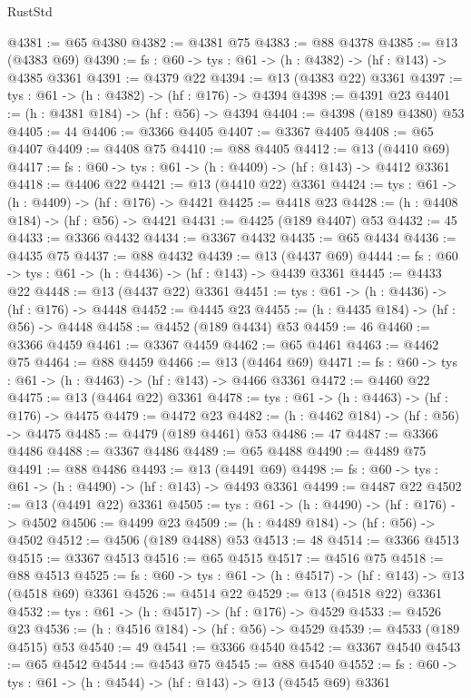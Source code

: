 \begin{lexlean}{RustStd}
\begin{coremodule}
@4381 := @65 @4380
@4382 := @4381 @75
@4383 := @88 @4378
@4385 := @13 (@4383 @69)
@4390 := {fs : @60} -> {tys : @61} -> (h : @4382) -> (hf : @143) -> @4385 @3361
@4391 := @4379 @22
@4394 := @13 (@4383 @22) @3361
@4397 := {tys : @61} -> (h : @4382) -> (hf : @176) -> @4394
@4398 := @4391 @23
@4401 := (h : @4381 @184) -> (hf : @56) -> @4394
@4404 := @4398 (@189 @4380) @53
@4405 := 44
@4406 := @3366 @4405
@4407 := @3367 @4405
@4408 := @65 @4407
@4409 := @4408 @75
@4410 := @88 @4405
@4412 := @13 (@4410 @69)
@4417 := {fs : @60} -> {tys : @61} -> (h : @4409) -> (hf : @143) -> @4412 @3361
@4418 := @4406 @22
@4421 := @13 (@4410 @22) @3361
@4424 := {tys : @61} -> (h : @4409) -> (hf : @176) -> @4421
@4425 := @4418 @23
@4428 := (h : @4408 @184) -> (hf : @56) -> @4421
@4431 := @4425 (@189 @4407) @53
@4432 := 45
@4433 := @3366 @4432
@4434 := @3367 @4432
@4435 := @65 @4434
@4436 := @4435 @75
@4437 := @88 @4432
@4439 := @13 (@4437 @69)
@4444 := {fs : @60} -> {tys : @61} -> (h : @4436) -> (hf : @143) -> @4439 @3361
@4445 := @4433 @22
@4448 := @13 (@4437 @22) @3361
@4451 := {tys : @61} -> (h : @4436) -> (hf : @176) -> @4448
@4452 := @4445 @23
@4455 := (h : @4435 @184) -> (hf : @56) -> @4448
@4458 := @4452 (@189 @4434) @53
@4459 := 46
@4460 := @3366 @4459
@4461 := @3367 @4459
@4462 := @65 @4461
@4463 := @4462 @75
@4464 := @88 @4459
@4466 := @13 (@4464 @69)
@4471 := {fs : @60} -> {tys : @61} -> (h : @4463) -> (hf : @143) -> @4466 @3361
@4472 := @4460 @22
@4475 := @13 (@4464 @22) @3361
@4478 := {tys : @61} -> (h : @4463) -> (hf : @176) -> @4475
@4479 := @4472 @23
@4482 := (h : @4462 @184) -> (hf : @56) -> @4475
@4485 := @4479 (@189 @4461) @53
@4486 := 47
@4487 := @3366 @4486
@4488 := @3367 @4486
@4489 := @65 @4488
@4490 := @4489 @75
@4491 := @88 @4486
@4493 := @13 (@4491 @69)
@4498 := {fs : @60} -> {tys : @61} -> (h : @4490) -> (hf : @143) -> @4493 @3361
@4499 := @4487 @22
@4502 := @13 (@4491 @22) @3361
@4505 := {tys : @61} -> (h : @4490) -> (hf : @176) -> @4502
@4506 := @4499 @23
@4509 := (h : @4489 @184) -> (hf : @56) -> @4502
@4512 := @4506 (@189 @4488) @53
@4513 := 48
@4514 := @3366 @4513
@4515 := @3367 @4513
@4516 := @65 @4515
@4517 := @4516 @75
@4518 := @88 @4513
@4525 := {fs : @60} -> {tys : @61} -> (h : @4517) -> (hf : @143) -> @13 (@4518 @69) @3361
@4526 := @4514 @22
@4529 := @13 (@4518 @22) @3361
@4532 := {tys : @61} -> (h : @4517) -> (hf : @176) -> @4529
@4533 := @4526 @23
@4536 := (h : @4516 @184) -> (hf : @56) -> @4529
@4539 := @4533 (@189 @4515) @53
@4540 := 49
@4541 := @3366 @4540
@4542 := @3367 @4540
@4543 := @65 @4542
@4544 := @4543 @75
@4545 := @88 @4540
@4552 := {fs : @60} -> {tys : @61} -> (h : @4544) -> (hf : @143) -> @13 (@4545 @69) @3361

\end{coremodule}
\end{lexlean}
